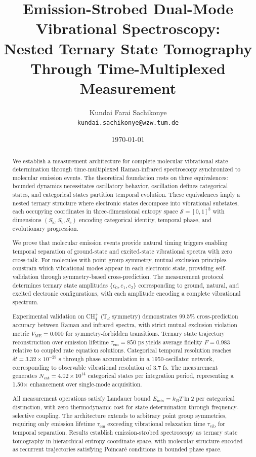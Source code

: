 \documentclass[twocolumn,10pt]{article}
\title{Emission-Strobed Dual-Mode Vibrational Spectroscopy: \\
Nested Ternary State Tomography Through Time-Multiplexed Measurement}
\author{
    Kundai Farai Sachikonye\\
    \texttt{kundai.sachikonye@wzw.tum.de}
}
\date{\today}
\newcommand{\Sk}{S_{\text{k}}}
\newcommand{\St}{S_{\text{t}}}
\newcommand{\Se}{S_{\text{e}}}
\newcommand{\Sspace}{\mathcal{S}}
\begin{document}
\maketitle

\begin{abstract}
We establish a measurement architecture for complete molecular vibrational state determination through time-multiplexed Raman-infrared spectroscopy synchronized to molecular emission events. The theoretical foundation rests on three equivalences: bounded dynamics necessitates oscillatory behavior, oscillation defines categorical states, and categorical states partition temporal evolution. These equivalences imply a nested ternary structure where electronic states decompose into vibrational substates, each occupying coordinates in three-dimensional entropy space $\Sspace = [0,1]^3$ with dimensions $(\Sk, \St, \Se)$ encoding categorical identity, temporal phase, and evolutionary progression.

We prove that molecular emission events provide natural timing triggers enabling temporal separation of ground-state and excited-state vibrational spectra with zero cross-talk. For molecules with point group symmetry, mutual exclusion principles constrain which vibrational modes appear in each electronic state, providing self-validation through symmetry-based cross-prediction. The measurement protocol determines ternary state amplitudes $\{c_0, c_1, c_2\}$ corresponding to ground, natural, and excited electronic configurations, with each amplitude encoding a complete vibrational spectrum.

Experimental validation on CH$_4^+$ (T$_d$ symmetry) demonstrates 99.5\% cross-prediction accuracy between Raman and infrared spectra, with strict mutual exclusion violation metric $V_{\text{ME}} = 0.000$ for symmetry-forbidden transitions. Ternary state trajectory reconstruction over emission lifetime $\tau_{\text{em}} = 850$ ps yields average fidelity $F = 0.983$ relative to coupled rate equation solutions. Categorical temporal resolution reaches $\delta t = 3.32 \times 10^{-29}$ s through phase accumulation in a 1950-oscillator network, corresponding to observable vibrational resolution of 3.7 fs. The measurement generates $N_{\text{cat}} = 4.02 \times 10^{14}$ categorical states per integration period, representing a 1.50$\times$ enhancement over single-mode acquisition.

All measurement operations satisfy Landauer bound $E_{\min} = k_B T \ln 2$ per categorical distinction, with zero thermodynamic cost for state determination through frequency-selective coupling. The architecture extends to arbitrary point group symmetries, requiring only emission lifetime $\tau_{\text{em}}$ exceeding vibrational relaxation time $\tau_{\text{vib}}$ for temporal separation. Results establish emission-strobed spectroscopy as ternary state tomography in hierarchical entropy coordinate space, with molecular structure encoded as recurrent trajectories satisfying Poincar\'e conditions in bounded phase space.
\end{abstract}
\end{document}
